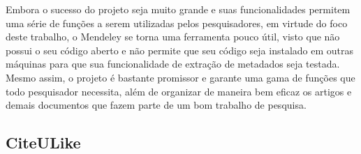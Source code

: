 \begin{textnew}
Embora o sucesso do projeto seja muito grande e suas funcionalidades permitem uma série de funções a serem utilizadas pelos pesquisadores, em virtude do foco deste trabalho, o Mendeley se torna uma ferramenta pouco útil, visto que não possui o seu código aberto e não permite que seu código seja instalado em outras máquinas para que sua funcionalidade de extração de metadados seja testada. Mesmo assim, o projeto é bastante promissor e garante uma gama de funções que todo pesquisador necessita, além de organizar de maneira bem eficaz os artigos e demais documentos que fazem parte de um bom trabalho de pesquisa.

\end{textnew}

\subsection{CiteULike}
\label{ssec:citeulike}

